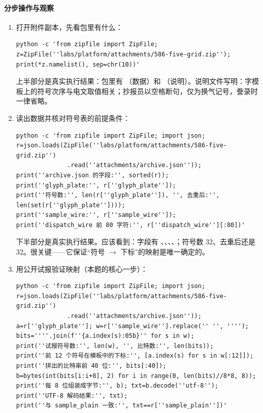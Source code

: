 \documentclass[UTF8,12pt,oneside]{ctexbook}
\begin{document}
\paragraph{分步操作与观察}
\begin{enumerate}[label=\arabic*.]
\item 打开附件副本，先看包里有什么：
\begin{lstlisting}
python -c 'from zipfile import ZipFile;
z=ZipFile(''labs/platform/attachments/586-five-grid.zip'');
print(*z.namelist(), sep=chr(10))'
\end{lstlisting}
 上半部分是真实执行结果：包里有 （数据）和 （说明）。说明文件写明：字模板上的符号次序与电文取值相关；抄报员以空格断句，仅为换气记号，誊录时一律省略。
\item 读出数据并核对符号表的前提条件：
\begin{lstlisting}
python -c 'from zipfile import ZipFile; import json;
r=json.loads(ZipFile(''labs/platform/attachments/586-five-grid.zip'')
              .read(''attachments/archive.json''));
print(''archive.json 的字段:'', sorted(r));
print(''glyph_plate:'', r[''glyph_plate'']);
print(''符号数:'', len(r[''glyph_plate'']), '', 去重后:'', len(set(r[''glyph_plate''])));
print(''sample_wire:'', r[''sample_wire'']);
print(''dispatch_wire 前 80 字符:'', r[''dispatch_wire''][:80])'
\end{lstlisting}
 下半部分是真实执行结果。应该看到：字段有 、、、、；符号数 32、去重后还是 32。很关键——它保证“符号 $\to$ 下标”的映射是唯一确定的。
\item 用公开试报验证映射（本题的核心一步）：
\begin{lstlisting}
python -c 'from zipfile import ZipFile; import json;
r=json.loads(ZipFile(''labs/platform/attachments/586-five-grid.zip'')
              .read(''attachments/archive.json''));
a=r[''glyph_plate'']; w=r[''sample_wire''].replace('' '', '''');
bits=''''.join(f''{a.index(s):05b}'' for s in w);
print(''试报符号数:'', len(w), '', 比特数:'', len(bits));
print(''前 12 个符号在模板中的下标:'', [a.index(s) for s in w[:12]]);
print(''拼出的比特串前 40 位:'', bits[:40]);
b=bytes(int(bits[i:i+8], 2) for i in range(0, len(bits)//8*8, 8));
print(''每 8 位组装成字节:'', b); txt=b.decode(''utf-8'');
print(''UTF-8 解码结果:'', txt);
print(''与 sample_plain 一致:'', txt==r[''sample_plain''])'
\end{lstlisting}

\end{enumerate}
\end{document}
